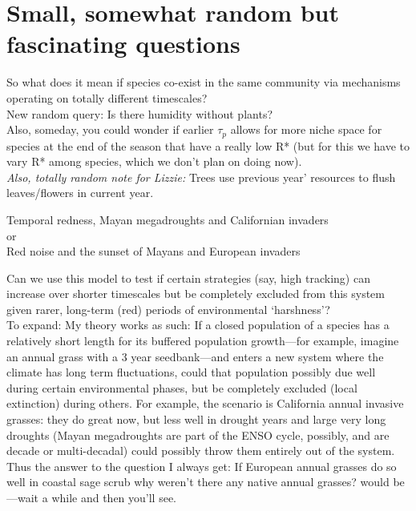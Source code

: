 \documentclass[11pt,a4paper,oneside]{article}
\begin{document}
\newpage
\section{Small, somewhat random but fascinating questions} 
\noindent So what does it mean if species co-exist in the same community via mechanisms operating on totally different timescales?\\

\noindent  New random query: Is there humidity without plants?\\

\noindent  Also, someday, you could wonder if earlier \(\tau_{p}\) allows for more niche space for species at the end of the season that have a really low R* (but for this we have to vary R* among species, which we don't plan on doing now).\\

\noindent  \emph{Also, totally random note for Lizzie:} Trees use previous year' resources to flush leaves/flowers in current year.

\newpage
\begin{center}
{\Large Temporal redness, Mayan megadroughts and Californian invaders\\ or\\ Red noise and the sunset of Mayans and European invaders}
\end{center}

\noindent Can we use this model to test if certain strategies (say, high tracking) can increase over shorter timescales but be completely excluded from this system given rarer, long-term (red) periods of environmental `harshness'?\\

To expand: My theory works as such: If a closed population of a species has a relatively short length for its buffered population growth---for example, imagine an annual grass with a 3 year seedbank---and enters a new system where the climate has long term fluctuations, could that population possibly due well during certain environmental phases, but be completely excluded (local extinction) during others. For example, the scenario is California annual invasive grasses: they do great now, but less well in drought years and large very long droughts (Mayan megadroughts are part of the ENSO cycle, possibly, and are decade or multi-decadal) could possibly throw them entirely out of the system. Thus the answer to the question I always get: If European annual grasses do so well in coastal sage scrub why weren't there any native annual grasses? would be---wait a while and  then you'll see. \\
\end{document}
